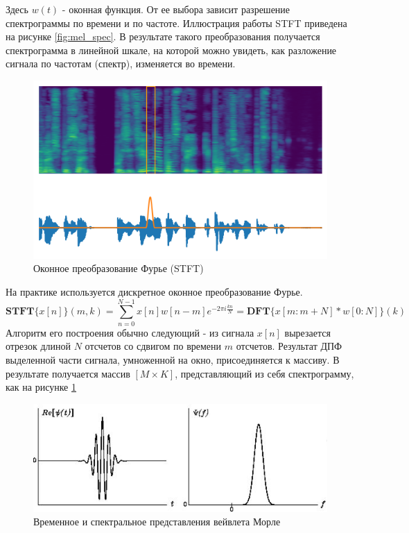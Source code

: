 Здесь \(w(t)\) - оконная функция. От ее выбора зависит разрешение спектрограммы по времени и по частоте. Иллюстрация работы STFT приведена на рисунке \ref{fig:mel_spec}.
В результате такого преобразования получается спектрограмма в линейной шкале, на которой можно увидеть, как разложение сигнала по частотам (спектр), изменяется во времени.

\begin{figure}
  \centering
  \includegraphics[width=16cm]{figures/stft}
  \caption{Оконное преобразование Фурье (STFT)}
  \label{fig:stft}
\end{figure}

На практике используется дискретное оконное преобразование Фурье.
\begin{equation}
  \textbf{STFT}\{x[n]\} (m, k) = \sum_{n=0}^{N-1} x[n] w[n - m] e^{-2\pi i  \frac{k n}{N}} = \textbf{DFT}\{x[m:m+N] * w[0:N]\}(k)
  \label{eq:stft}
\end{equation}
Алгоритм его построения обычно следующий - из сигнала \(x[n]\) вырезается отрезок длиной \(N\) отсчетов со сдвигом по времени \(m\) отсчетов. 
Результат ДПФ выделенной части сигнала, умноженной на окно, присоединяется к массиву. В результате получается массив \([M \times K]\), 
представляющий из себя спектрограмму, как на рисунке \ref{fig:stft}

\begin{figure}
  \includegraphics[width=0.9\linewidth]{figures/wavelet}
  \caption{Временное и спектральное представления вейвлета Морле \cite{MorleWavelet}}
  \label{fig:wavelet}
\end{figure}

